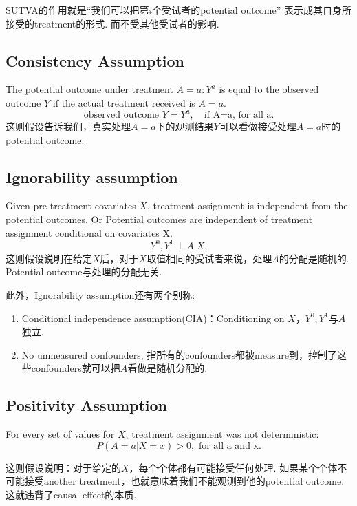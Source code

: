SUTVA的作用就是“我们可以把第$i$个受试者的potential outcome” 表示成其自身所接受的treatment的形式. 而不受其他受试者的影响.

\subsection{Consistency Assumption}
The potential outcome under treatment $A=a: Y^a$ is equal to the observed outcome $Y$ if the actual treatment received is $A=a$.
\begin{equation}
\text{observed outcome  }Y = Y^a,\quad \text{if A=a, for all a.}
\end{equation} 
这则假设告诉我们，真实处理$A=a$下的观测结果$Y$可以看做接受处理$A=a$时的potential outcome.

\subsection{Ignorability assumption}
Given pre-treatment covariates $X$, treatment assignment is independent from the potential outcomes. Or Potential outcomes are independent of treatment assignment conditional on covariates X.
\begin{equation}
Y^0,Y^1 \perp A|X.
\end{equation}
这则假设说明在给定$X$后，对于$X$取值相同的受试者来说，处理$A$的分配是随机的. Potential outcome与处理的分配无关. 

此外，Ignorability assumption还有两个别称:
\begin{enumerate}[label=(\arabic*)]
	\item Conditional independence assumption(CIA)：Conditioning on $X$，$Y^0, Y^1$与$A$独立. 
    \item No unmeasured confounders, 指所有的confounders都被measure到，控制了这些confounders就可以把$A$看做是随机分配的.
\end{enumerate}


\subsection{Positivity Assumption}
For every set of values for $X$, treatment assignment was not deterministic:
\begin{equation}
P(A=a|X=x)>0,\text{  for all a and x.}
\end{equation} 

这则假设说明：对于给定的$X$，每个个体都有可能接受任何处理. 如果某个个体不可能接受another treatment，也就意味着我们不能观测到他的potential outcome. 这就违背了causal effect的本质.

